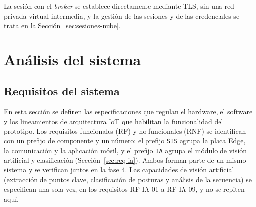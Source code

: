 \documentclass[12pt,a4paper,oneside]{book}
\theoremstyle{plain}
\theoremstyle{definition}
\theoremstyle{remark}
\begin{document}
La sesión con el \textit{broker} se establece directamente mediante TLS, sin una red privada virtual intermedia, y la gestión de las sesiones y de las credenciales se trata en la Sección~\ref{sec:sesiones-nube}.

\chapter{Análisis del sistema}
\label{cap:analisis}

\section{Requisitos del sistema}
\label{sec:req-sistema}

En esta sección se definen las especificaciones que regulan el hardware, el software y los lineamientos de arquitectura IoT que habilitan la funcionalidad del prototipo. Los requisitos funcionales (RF) y no funcionales (RNF) se identifican con un prefijo de componente y un número: el prefijo \texttt{SIS} agrupa la placa Edge, la comunicación y la aplicación móvil, y el prefijo \texttt{IA} agrupa el módulo de visión artificial y clasificación (Sección~\ref{sec:req-ia}). Ambos forman parte de un mismo sistema y se verifican juntos en la fase 4. Las capacidades de visión artificial (extracción de puntos clave, clasificación de posturas y análisis de la secuencia) se especifican una sola vez, en los requisitos RF-IA-01 a RF-IA-09, y no se repiten aquí.
\end{document}
